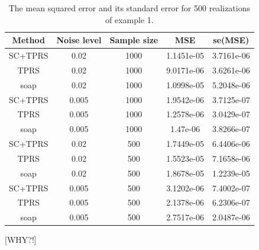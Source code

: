 \documentclass[a4paper,10pt]{amsart}
\begin{document}
\begin{table}[ht]
\begin{tabular}{c c c c c}\\
Method & Noise level & Sample size & MSE & se(MSE)\\
\hline
\hline
SC+TPRS & 0.02 & 1000 & 1.1451e-05 & 3.7161e-06\\
TPRS & 0.02 & 1000 & 9.0171e-06 & 3.6261e-06\\
soap & 0.02 & 1000 & 1.0998e-05 & 5.2048e-06\\
SC+TPRS & 0.005 & 1000 & 1.9542e-06 & 3.7125e-07\\
TPRS & 0.005 & 1000 & 1.2578e-06 & 3.0429e-07\\
soap & 0.005 & 1000 & 1.47e-06 & 3.8266e-07\\
SC+TPRS & 0.02 & 500 & 1.7449e-05 & 6.4406e-06\\
TPRS & 0.02 & 500 & 1.5523e-05 & 7.1658e-06\\
soap & 0.02 & 500 & 1.8678e-05 & 1.2239e-05\\
SC+TPRS & 0.005 & 500 & 3.1202e-06 & 7.4002e-07\\
TPRS & 0.005 & 500 & 2.1378e-06 & 6.2306e-07\\
soap & 0.005 & 500 & 2.7517e-06 & 2.0487e-06\\
\end{tabular}
\caption{The mean squared error and its standard error for 500 realizations of example 1.}
\label{fig9-disk-table}
\end{table}

[WHY?!]
\end{document}
